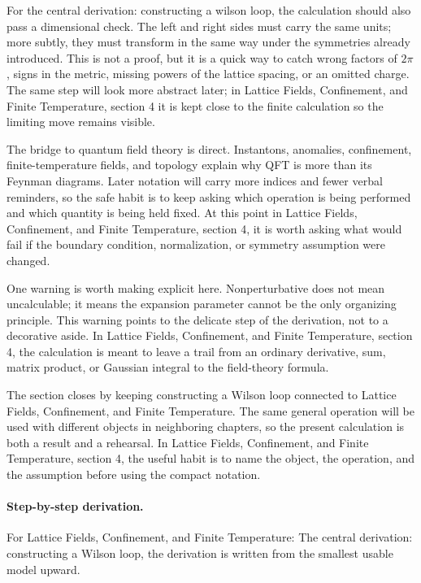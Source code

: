 For the central derivation: constructing a wilson loop, the calculation should also pass a dimensional check.  The left and right sides must carry the same units; more subtly, they must transform in the same way under the symmetries already introduced.  This is not a proof, but it is a quick way to catch wrong factors of \(2\pi\), signs in the metric, missing powers of the lattice spacing, or an omitted charge.  The same step will look more abstract later; in Lattice Fields, Confinement, and Finite Temperature, section 4 it is kept close to the finite calculation so the limiting move remains visible.

The bridge to quantum field theory is direct.  Instantons, anomalies, confinement, finite-temperature fields, and topology explain why QFT is more than its Feynman diagrams.  Later notation will carry more indices and fewer verbal reminders, so the safe habit is to keep asking which operation is being performed and which quantity is being held fixed.  At this point in Lattice Fields, Confinement, and Finite Temperature, section 4, it is worth asking what would fail if the boundary condition, normalization, or symmetry assumption were changed.

One warning is worth making explicit here.  Nonperturbative does not mean uncalculable; it means the expansion parameter cannot be the only organizing principle.  This warning points to the delicate step of the derivation, not to a decorative aside.  In Lattice Fields, Confinement, and Finite Temperature, section 4, the calculation is meant to leave a trail from an ordinary derivative, sum, matrix product, or Gaussian integral to the field-theory formula.

The section closes by keeping constructing a Wilson loop connected to Lattice Fields, Confinement, and Finite Temperature.  The same general operation will be used with different objects in neighboring chapters, so the present calculation is both a result and a rehearsal.  In Lattice Fields, Confinement, and Finite Temperature, section 4, the useful habit is to name the object, the operation, and the assumption before using the compact notation.



\paragraph{Step-by-step derivation.}

For Lattice Fields, Confinement, and Finite Temperature: The central derivation: constructing a Wilson loop, the derivation is written from the smallest usable model upward.

